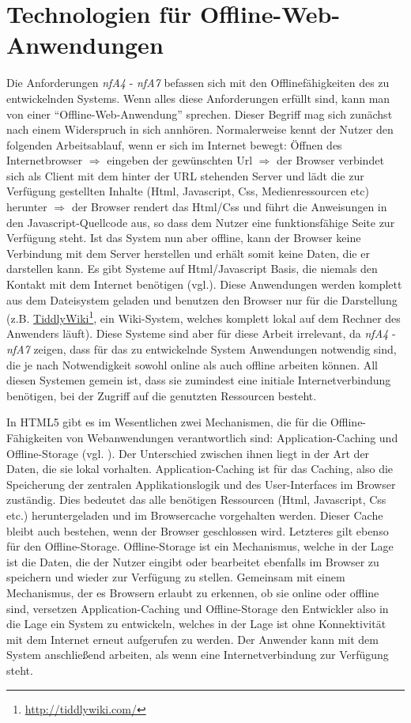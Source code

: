 \section{Technologien für Offline-Web-Anwendungen}
Die Anforderungen \emph{nfA4} - \emph{nfA7} befassen sich mit den Offlinefähigkeiten des zu entwickelnden Systems. Wenn alles diese Anforderungen erfüllt sind, kann man von einer "`Offline-Web-Anwendung"' sprechen. Dieser Begriff mag sich zunächst nach einem Widerspruch in sich annhören. Normalerweise kennt der Nutzer den folgenden Arbeitsablauf, wenn er sich im Internet bewegt: Öffnen des Internetbrowser $\Rightarrow$ eingeben der gewünschten Url $\Rightarrow$ der Browser verbindet sich als Client mit dem hinter der URL stehenden Server und lädt die zur Verfügung gestellten Inhalte (Html, Javascript, Css, Medienressourcen etc) herunter $\Rightarrow$ der Browser rendert das Html/Css und führt die Anweisungen in den Javascript-Quellcode aus, so dass dem Nutzer eine funktionsfähige Seite zur Verfügung steht. Ist das System nun aber offline, kann der Browser keine Verbindung mit dem Server herstellen und erhält somit keine Daten, die er darstellen kann. Es gibt Systeme auf Html/Javascript Basis, die niemals den Kontakt mit dem Internet benötigen (vgl.\cite{Mahemoff22010}). Diese Anwendungen werden komplett aus dem Dateisystem geladen und benutzen den Browser nur für die Darstellung (z.B. \href{http://tiddlywiki.com}{TiddlyWiki}\footnote{\url{http://tiddlywiki.com/}}, ein Wiki-System, welches komplett lokal auf dem Rechner des Anwenders läuft). Diese Systeme sind aber für diese Arbeit irrelevant, da \emph{nfA4} - \emph{nfA7} zeigen, dass für das zu entwickelnde System Anwendungen notwendig sind, die je nach Notwendigkeit sowohl online als auch offline arbeiten können. All diesen Systemen gemein ist, dass sie zumindest eine initiale Internetverbindung benötigen, bei der Zugriff auf die genutzten Ressourcen besteht.

In HTML5 gibt es im Wesentlichen zwei Mechanismen, die für die Offline-Fähigkeiten von Webanwendungen verantwortlich sind: Application-Caching und Offline-Storage (vgl. \cite{Mahemoff22010}). Der Unterschied zwischen ihnen liegt in der Art der Daten, die sie lokal vorhalten. Application-Caching ist für das Caching, also die Speicherung der zentralen Applikationslogik und des User-Interfaces im Browser zuständig. Dies bedeutet das alle benötigen Ressourcen (Html, Javascript, Css etc.) heruntergeladen und im Browsercache vorgehalten werden. Dieser Cache bleibt auch bestehen, wenn der Browser geschlossen wird. Letzteres gilt ebenso für den Offline-Storage. Offline-Storage ist ein Mechanismus, welche in der Lage ist die Daten, die der Nutzer eingibt oder bearbeitet ebenfalls im Browser zu speichern und wieder zur Verfügung zu stellen. Gemeinsam mit einem Mechanismus, der es Browsern erlaubt zu erkennen, ob sie online oder offline sind, versetzen Application-Caching und Offline-Storage den Entwickler also in die Lage ein System zu entwickeln, welches in der Lage ist ohne Konnektivität mit dem Internet erneut aufgerufen zu werden. Der Anwender kann mit dem System anschließend arbeiten, als wenn eine Internetverbindung zur Verfügung steht.

